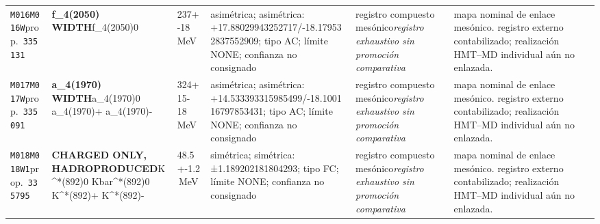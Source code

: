 \begin{landscape}
\begin{longtable}{L{1.85cm}L{4.45cm}L{2.35cm}L{4.05cm}L{3.35cm}L{7.15cm}}
\texttt{M016}\newline \texttt{M016W}\newline prop.\ \texttt{335131} & \textbf{f\_\allowbreak{}4(2050) WIDTH}\newline f\_\allowbreak{}4(2050)0 & 237+-18\,MeV & asimétrica; asimétrica: +17.88029943252717/-18.179532837552909; tipo AC; límite NONE; confianza no consignado & registro compuesto mesónico\newline \emph{registro exhaustivo sin promoción comparativa} & mapa nominal de enlace mesónico. registro externo contabilizado; realización HMT--MD individual aún no enlazada. \\
\texttt{M017}\newline \texttt{M017W}\newline prop.\ \texttt{335091} & \textbf{a\_\allowbreak{}4(1970) WIDTH}\newline a\_\allowbreak{}4(1970)0 \textbar{}\allowbreak{} a\_\allowbreak{}4(1970)+ \textbar{}\allowbreak{} a\_\allowbreak{}4(1970)- & 324+15-18\,MeV & asimétrica; asimétrica: +14.533393315985499/-18.100116797853431; tipo AC; límite NONE; confianza no consignado & registro compuesto mesónico\newline \emph{registro exhaustivo sin promoción comparativa} & mapa nominal de enlace mesónico. registro externo contabilizado; realización HMT--MD individual aún no enlazada. \\
\texttt{M018}\newline \texttt{M018W1}\newline prop.\ \texttt{335795} & \textbf{CHARGED ONLY, HADROPRODUCED}\newline K\textasciicircum{}*(892)0 \textbar{}\allowbreak{} Kbar\textasciicircum{}*(892)0 \textbar{}\allowbreak{} K\textasciicircum{}*(892)+ \textbar{}\allowbreak{} K\textasciicircum{}*(892)- & 48.5+-1.2\,MeV & simétrica; simétrica: ±1.189202181804293; tipo FC; límite NONE; confianza no consignado & registro compuesto mesónico\newline \emph{registro exhaustivo sin promoción comparativa} & mapa nominal de enlace mesónico. registro externo contabilizado; realización HMT--MD individual aún no enlazada. \\

\end{longtable}
\end{landscape}
